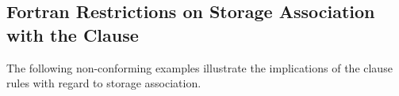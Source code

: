 \begin{fortranspecific}[4ex]
\section{Fortran Restrictions on Storage Association with the  Clause}
\label{sec:fort_sa_private}

The following non-conforming examples illustrate the implications of the  
clause rules with regard to storage association. 

\pagebreak
{}




\end{fortranspecific}

